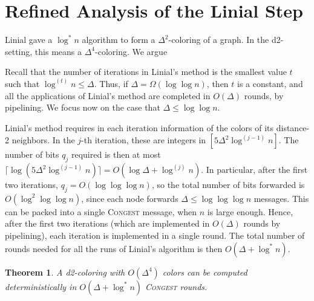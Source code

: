 \documentclass[12pt]{article}
\newtheorem{theorem}{Theorem}[section]
\newcommand{\congest}{\textsc{Congest}}
\begin{document}


\section{Refined Analysis of the Linial Step}

Linial gave a $\log^* n$ algorithm to form a $\Delta^2$-coloring of a graph. In the d2-setting, this means a $\Delta^4$-coloring.
We argue

Recall that the number of iterations in Linial's method is the smallest value $t$ such that $\log^{(t)} n \le \Delta$.
Thus, if $\Delta = \Omega(\log\log n)$, then $t$ is a constant, and all the applications of Linial's method are completed in $O(\Delta)$ rounds, by pipelining.
We focus now on the case that $\Delta \le \log\log n$.

Linial's method requires in each iteration information of the colors of its distance-2 neighbors.
In the $j$-th iteration, these are integers in $[5\Delta^2 \log^{(j-1)} n]$. The number of bits $q_j$ required is then at most $\lceil \log (5\Delta^2 \log^{(j-1)} n) \rceil = O(\log \Delta + \log^{(j)} n)$. 
In particular, after the first two iterations, $q_j = O(\log\log\log n)$, so the total number of bits forwarded is $O(\log^2\log\log n)$, since each node forwards $\Delta \le \log\log\log n$ messages.
This can be packed into a single {\congest} message, when $n$ is large enough.
Hence, after the first two iterations (which are implemented in $O(\Delta)$ rounds by pipelining), each iteration is implemented in a single round.
The total number of rounds needed for all the runs of Linial's algorithm is then $O(\Delta + \log^* n)$.

\begin{theorem}
A d2-coloring with $O(\Delta^4)$ colors can be computed deterministically in $O(\Delta + \log^* n)$ {\congest} rounds.
\end{theorem}
\end{document}
